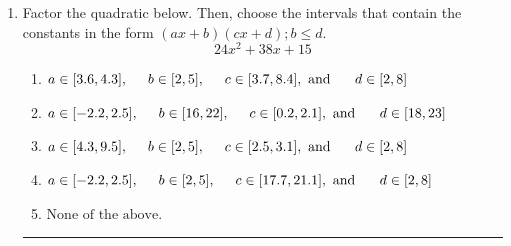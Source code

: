 \documentclass[14pt]{extbook}
\newcommand{\litem}[1]{\item#1\hspace*{-1cm}\rule{\textwidth}{0.4pt}}
\begin{document}
\begin{enumerate}
{\begin{enumerate}[label=\Alph*.]
\end{enumerate} }
\litem{
Factor the quadratic below. Then, choose the intervals that contain the constants in the form $(ax+b)(cx+d); b \leq d.$\[ 24x^{2} +38 x + 15 \]\begin{enumerate}[label=\Alph*.]
\item \( a \in [3.6, 4.3], \hspace*{5mm} b \in [2, 5], \hspace*{5mm} c \in [3.7, 8.4], \text{ and } \hspace*{5mm} d \in [2, 8] \)
\item \( a \in [-2.2, 2.5], \hspace*{5mm} b \in [16, 22], \hspace*{5mm} c \in [0.2, 2.1], \text{ and } \hspace*{5mm} d \in [18, 23] \)
\item \( a \in [4.3, 9.5], \hspace*{5mm} b \in [2, 5], \hspace*{5mm} c \in [2.5, 3.1], \text{ and } \hspace*{5mm} d \in [2, 8] \)
\item \( a \in [-2.2, 2.5], \hspace*{5mm} b \in [2, 5], \hspace*{5mm} c \in [17.7, 21.1], \text{ and } \hspace*{5mm} d \in [2, 8] \)
\item \( \text{None of the above.} \)


\end{enumerate}}
\end{enumerate}
\end{document}
